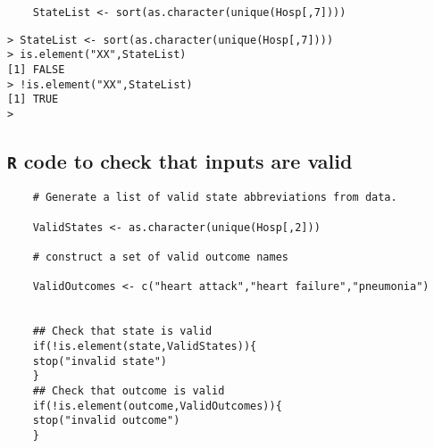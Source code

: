 \documentclass[]{article}
\begin{document}
\begin{framed}
	\begin{verbatim}
	StateList <- sort(as.character(unique(Hosp[,7])))
	\end{verbatim}
\end{framed}

\newpage

\begin{verbatim}
> StateList <- sort(as.character(unique(Hosp[,7])))
> is.element("XX",StateList)
[1] FALSE
> !is.element("XX",StateList)
[1] TRUE
>
\end{verbatim}
\newpage

\subsection{\texttt{R} code to check that inputs are valid}

\begin{framed}
	\begin{verbatim}
	# Generate a list of valid state abbreviations from data.
	
	ValidStates <- as.character(unique(Hosp[,2]))
	
	# construct a set of valid outcome names
	
	ValidOutcomes <- c("heart attack","heart failure","pneumonia")
	
	
	## Check that state is valid
	if(!is.element(state,ValidStates)){
	stop("invalid state")
	}
	## Check that outcome is valid
	if(!is.element(outcome,ValidOutcomes)){
	stop("invalid outcome")
	}
	
	\end{verbatim}
\end{framed}

\end{document}
